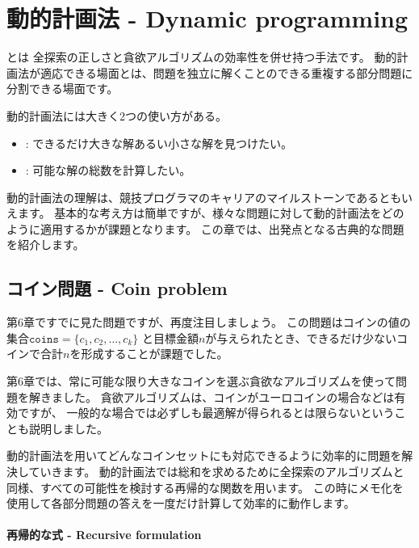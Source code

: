 \chapter{動的計画法 - Dynamic programming}


とは
全探索の正しさと貪欲アルゴリズムの効率性を併せ持つ手法です。
動的計画法が適応できる場面とは、問題を独立に解くことのできる重複する部分問題に分割できる場面です。

動的計画法には大きく2つの使い方がある。

\begin{itemize}
\item
{}:
できるだけ大きな解あるい小さな解を見つけたい。
\item
{}:
可能な解の総数を計算したい。
\end{itemize}

動的計画法の理解は、競技プログラマのキャリアのマイルストーンであるともいえます。
基本的な考え方は簡単ですが、様々な問題に対して動的計画法をどのように適用するかが課題となります。
この章では、出発点となる古典的な問題を紹介します。

\section{コイン問題 - Coin problem}

第6章ですでに見た問題ですが、再度注目しましょう。
この問題はコインの値の集合$\texttt{coins} = \{c_1,c_2,\ldots,c_k\}$
と目標金額$n$が与えられたとき、できるだけ少ないコインで合計$n$を形成することが課題でした。

第6章では、常に可能な限り大きなコインを選ぶ貪欲なアルゴリズムを使って問題を解きました。
貪欲アルゴリズムは、コインがユーロコインの場合などは有効ですが、
一般的な場合では必ずしも最適解が得られるとは限らないということも説明しました。

動的計画法を用いてどんなコインセットにも対応できるように効率的に問題を解決していきます。
動的計画法では総和を求めるために全探索のアルゴリズムと同様、すべての可能性を検討する再帰的な関数を用います。
この時にメモ化を使用して各部分問題の答えを一度だけ計算して効率的に動作します。

\subsubsection{再帰的な式 - Recursive formulation}


